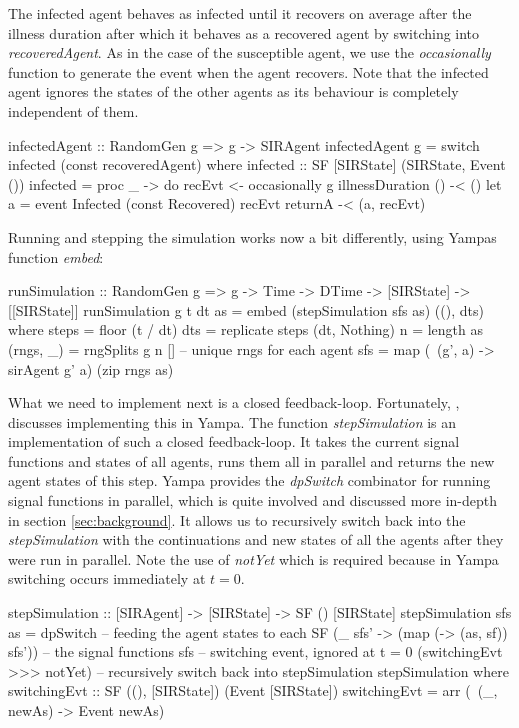 The infected agent behaves as infected until it recovers on average after the illness duration after which it behaves as a recovered agent by switching into \textit{recoveredAgent}. As in the case of the susceptible agent, we use the \textit{occasionally} function to generate the event when the agent recovers. Note that the infected agent ignores the states of the other agents as its behaviour is completely independent of them.

\begin{HaskellCode}
infectedAgent :: RandomGen g => g -> SIRAgent
infectedAgent g = switch infected (const recoveredAgent)
  where
    infected :: SF [SIRState] (SIRState, Event ())
    infected = proc _ -> do
      recEvt <- occasionally g illnessDuration () -< ()
      let a = event Infected (const Recovered) recEvt
      returnA -< (a, recEvt)
\end{HaskellCode}

Running and stepping the simulation works now a bit differently, using Yampas function \textit{embed}:

\begin{HaskellCode}
runSimulation :: RandomGen g 
  => g -> Time -> DTime -> [SIRState] -> [[SIRState]]
runSimulation g t dt as 
    = embed (stepSimulation sfs as) ((), dts)
  where
    steps     = floor (t / dt)
    dts       = replicate steps (dt, Nothing)
    n         = length as
    (rngs, _) = rngSplits g n [] -- unique rngs for each agent
    sfs       = map (\ (g', a) -> sirAgent g' a) (zip rngs as)
\end{HaskellCode}

What we need to implement next is a closed feedback-loop. Fortunately, \cite{nilsson_functional_2002}, \cite{courtney_yampa_2003} discusses implementing this in Yampa. The function \textit{stepSimulation} is an implementation of such a closed feedback-loop. It takes the current signal functions and states of all agents, runs them all in parallel and returns the new agent states of this step. Yampa provides the \textit{dpSwitch} combinator for running signal functions in parallel, which is quite involved and discussed more in-depth in section \ref{sec:background}. It allows us to recursively switch back into the \textit{stepSimulation} with the continuations and new states of all the agents after they were run in parallel. Note the use of \textit{notYet} which is required because in Yampa switching occurs immediately at $t = 0$.

\begin{HaskellCode}
stepSimulation :: [SIRAgent] -> [SIRState] -> SF () [SIRState]
stepSimulation sfs as =
    dpSwitch
      -- feeding the agent states to each SF
      (\_ sfs' -> (map (\sf -> (as, sf)) sfs'))
      -- the signal functions
      sfs
      -- switching event, ignored at t = 0         
      (switchingEvt >>> notYet)
      -- recursively switch back into stepSimulation         
      stepSimulation                            
  where
    switchingEvt :: SF ((), [SIRState]) (Event [SIRState])
    switchingEvt = arr (\ (_, newAs) -> Event newAs)
\end{HaskellCode}


